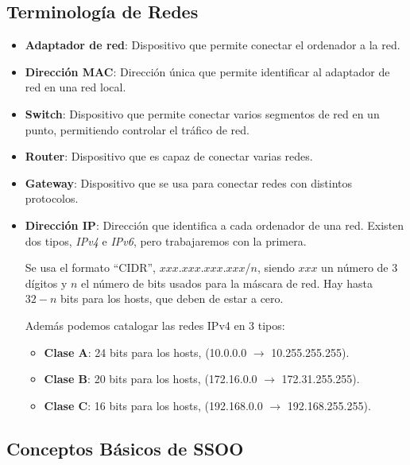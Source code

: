 \subsection{Terminología de Redes}
\begin{itemize}
        \item \textbf{Adaptador de red}: Dispositivo que permite conectar el ordenador a la red.
        \item \textbf{Dirección MAC}: Dirección única que permite identificar al adaptador de red en una red local.
        \item \textbf{Switch}: Dispositivo que permite conectar varios segmentos de red en un punto, permitiendo controlar el tráfico de red.
        \item \textbf{Router}: Dispositivo que es capaz de conectar varias redes.
        \item \textbf{Gateway}: Dispositivo que se usa para conectar redes con distintos protocolos.
        \item \textbf{Dirección IP}: Dirección que identifica a cada ordenador de una red. Existen dos tipos, \textit{IPv4} e \textit{IPv6}, pero trabajaremos con la primera. \par  Se usa el formato ``CIDR'', \(xxx\).\(xxx\).\(xxx\).\(xxx\)/\(n\), siendo \(xxx\) un número de 3 dígitos y \(n\) el número de bits usados para la máscara de red. Hay hasta \(32-n\) bits para los hosts, que deben de estar a cero. \par  Además podemos catalogar las redes IPv4 en 3 tipos:
              \begin{itemize}
                      \item  \textbf{Clase A}: 24 bits para los hosts, (10.0.0.0 \(\rightarrow\) 10.255.255.255).\item  \textbf{Clase B}: 20 bits para los hosts, (172.16.0.0 \(\rightarrow\) 172.31.255.255).\item \textbf{Clase C}: 16 bits para los hosts, (192.168.0.0 \(\rightarrow\) 192.168.255.255).
              \end{itemize}
\end{itemize}
\subsection{Conceptos Básicos de SSOO}
